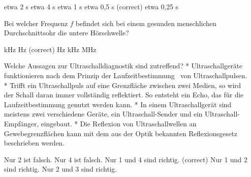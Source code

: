 \documentclass[11pt]{exam}
\begin{document}
\begin{questions}
\begin{choices}
	\choice etwa 2 s
	\choice etwa 4 s
	\choice etwa 1 s
	\choice etwa 0,5 s (correct)
	\choice etwa 0,25 s
\end{choices}

\vspace{3mm}\question Bei welcher Frequenz \( f \) befindet sich bei einem gesunden menschlichen Durchschnittsohr die untere Hörschwelle?

\begin{choices}
	 kHz
	 Hz (correct)
	 Hz
	 kHz
	 MHz
\end{choices}

\vspace{3mm}\question Welche Aussagen zur Ultraschalldiagnostik sind zutreffend?	* Ultraschallgeräte funktionieren nach dem Prinzip der Laufzeitbestimmung  von Ultraschallpulsen.	* Trifft ein Ultraschallpuls auf eine Grenzfläche zwischen zwei Medien, so wird der Schall daran immer vollständig reflektiert. So entsteht ein Echo, das für die Laufzeitbestimmung genutzt werden kann.	* In einem Ultraschallgerät sind meistens zwei verschiedene Geräte, ein Ultraschall-Sender und ein Ultraschall-Empfänger, eingebaut.	* Die Reflexion von Ultraschallwellen an Gewebegrenzflächen kann mit dem aus der Optik bekannten Reflexionsgesetz beschrieben werden.

\begin{choices}
	\choice Nur 2 ist falsch.
	\choice Nur 4 ist falsch.
	\choice Nur 1 und 4 sind richtig. (correct)
	\choice Nur 1 und 2 sind richtig.
	\choice Nur 2 und 3 sind richtig.
\end{choices}

\vspace{3mm}\end{questions}
\end{document}
